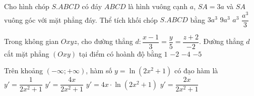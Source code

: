 \begin{ex}%
	Cho hình chóp $S.ABCD$ có đáy $ABCD$ là hình vuông cạnh $a$, $SA=3a$ và $SA$ vuông góc với mặt phẳng đáy. Thể tích khối chóp $S.ABCD$ bằng
	\choice
	{$3a^3$}
	{$9a^3$}
	{\True $a^3$}
	{$\dfrac{a^3}{3}$}
\end{ex}

\begin{ex}%
	Trong không gian $ Oxyz$, cho đường thẳng $d\colon\dfrac{x-1}{3}=\dfrac{y}{5}=\dfrac{z+2}{-2}$. Đường thẳng $d$ cắt mặt phẳng $\left(Oxy\right)$ tại điểm có hoành độ bằng
	\choice
	{$1$}
	{\True $-2$}
	{$-4$}
	{$-5$}
\end{ex}

\begin{ex}%
	Trên khoảng $\left(-\infty ;+\infty\right)$, hàm số $y=\ln \left(2x^2+1\right)$ có đạo hàm là
	\choice
	{$ y'=\dfrac{1}{2x^2+1}$}
	{\True $ y'=\dfrac{4x}{2x^2+1}$}
	{$ y'=4x\cdot\ln \left(2x^2+1\right)$}
	{$ y'=\dfrac{2x}{2x^2+1}$}
\end{ex}

